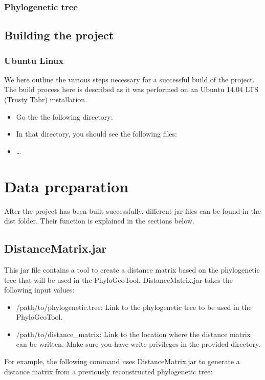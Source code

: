 \documentclass[a4paper, 11pt]{article} %
\begin{document}
\subsubsection*{Phylogenetic tree} %



\subsection{Building the project}

\subsubsection{Ubuntu Linux}

We here outline the various steps necessary for a successful build of the project.
The build process here is described as it was performed on an Ubuntu 14.04 LTS (Trusty Tahr) installation.
\begin{itemize}
\item Go the the following directory:
\item In that directory, you should see the following files:
\item \ldots
\end{itemize}

\section{Data preparation}
After the project has been built successfully, different jar files can be found in the dist folder. 
Their function is explained in the sections below.

\subsection{DistanceMatrix.jar}
This jar file contains a tool to create a distance matrix based on the phylogenetic tree that will be used in the PhyloGeoTool.
DistanceMatrix.jar takes the following input values:
\begin{itemize}
\item /path/to/phylogenetic.tree: Link to the phylogenetic tree to be used in the PhyloGeoTool. %
\item /path/to/distance\_matrix: Link to the location where the distance matrix can be written. Make sure you have write privileges in the provided directory.
\end{itemize}
For example, the following command uses DistanceMatrix.jar to generate a distance matrix from a previously reconstructed phylogenetic tree: %
\end{document}
